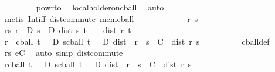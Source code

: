 \begin{isabellebody}
\ \ \ \ \ \ \isamarkupfalse%
\ {\isacharasterisk}{\kern0pt}\ powr{\isacharunderscore}{\kern0pt}to{\isacharunderscore}{\kern0pt}{}\ \isamarkupfalse%
\ local{\isacharunderscore}{\kern0pt}holder{\isacharunderscore}{\kern0pt}on{\isacharunderscore}{\kern0pt}cball\ \isamarkupfalse%
\ auto\isanewline
\ \ \ \ \ \ \isamarkupfalse%
\ {\isacharparenleft}{\kern0pt}metis\ Int{\isacharunderscore}{\kern0pt}iff\ dist{\isacharunderscore}{\kern0pt}commute\ mem{\isacharunderscore}{\kern0pt}cball{\isacharparenright}{\kern0pt}\isanewline
\ \ \ \ \isacommand{{\isacharbraceleft}{\kern0pt}}\isamarkupfalse%
\isanewline
\ \ \ \ \ \ \isamarkupfalse%
\ r\ s\ \isamarkupfalse%
\ rs{\isacharcolon}{\kern0pt}\ {\isachardoublequoteopen}r\ {\isasymin}\ D{\isachardoublequoteclose}\ {\isachardoublequoteopen}s\ {\isasymin}\ D{\isachardoublequoteclose}\ {\isachardoublequoteopen}dist\ s\ t\ {\isasymle}\ {\isasymepsilon}\ {\isasymand}\ dist\ r\ t\ {\isasymle}\ {\isasymepsilon}{\isachardoublequoteclose}\isanewline
\ \ \ \ \ \ \isamarkupfalse%
\ \isamarkupfalse%
\ {\isachardoublequoteopen}r\ {\isasymin}\ cball\ t\ {\isasymepsilon}\ {\isasyminter}\ D{\isachardoublequoteclose}\ {\isachardoublequoteopen}s{\isasymin}cball\ t\ {\isasymepsilon}\ {\isasyminter}\ D{\isachardoublequoteclose}\ {\isachardoublequoteopen}dist\ {\isacharparenleft}{\kern0pt}{\isasymphi}\ r{\isacharparenright}{\kern0pt}\ {\isacharparenleft}{\kern0pt}{\isasymphi}\ s{\isacharparenright}{\kern0pt}\ {\isasymle}\ C\ {\isacharasterisk}{\kern0pt}\ dist\ r\ s{\isachardoublequoteclose}\isanewline
\ \ \ \ \ \ \ \ \isamarkupfalse%
\ cball{\isacharunderscore}{\kern0pt}def\ \isamarkupfalse%
\ rs\ eC\ \isamarkupfalse%
\ {\isacharparenleft}{\kern0pt}auto\ simp{\isacharcolon}{\kern0pt}\ dist{\isacharunderscore}{\kern0pt}commute{\isacharparenright}{\kern0pt}\isanewline
\ \ \ \ \isacommand{{\isacharbraceright}{\kern0pt}}\isamarkupfalse%
\isanewline
\ \ \ \ \isamarkupfalse%
\ \isamarkupfalse%
\ {\isachardoublequoteopen}{\isasymforall}r{\isasymin}cball\ t\ {\isasymepsilon}\ {\isasyminter}\ D{\isachardot}{\kern0pt}\ {\isasymforall}s{\isasymin}cball\ t\ {\isasymepsilon}\ {\isasyminter}\ D{\isachardot}{\kern0pt}\ dist\ {\isacharparenleft}{\kern0pt}{\isasymphi}\ r{\isacharparenright}{\kern0pt}\ {\isacharparenleft}{\kern0pt}{\isasymphi}\ s{\isacharparenright}{\kern0pt}\ {\isasymle}\ C\ {\isacharasterisk}{\kern0pt}\ dist\ r\ s{\isachardoublequoteclose}\isanewline

\end{isabellebody}
